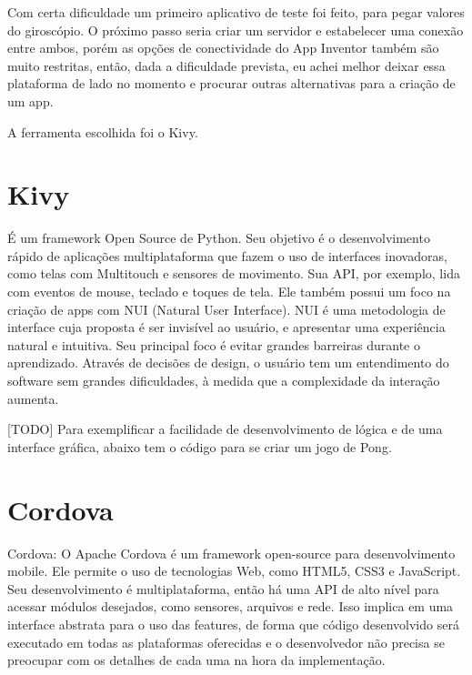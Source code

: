 \documentclass[a4paper,12pt]{article}
\begin{document}
Com certa dificuldade um primeiro aplicativo de teste foi feito, para pegar valores do giroscópio. O próximo passo seria criar um servidor e estabelecer uma conexão entre ambos, porém as opções de conectividade do App Inventor também são muito restritas, então, dada a dificuldade prevista, eu achei melhor deixar essa plataforma de lado no momento e procurar outras alternativas para a criação de um app.


A ferramenta escolhida foi o Kivy.

\section{Kivy}

É um framework Open Source de Python. Seu objetivo é o desenvolvimento rápido de aplicações multiplataforma que fazem o uso de interfaces inovadoras, como telas com Multitouch e sensores de movimento. Sua API, por exemplo, lida com eventos de mouse, teclado e toques de tela. Ele também possui um foco na criação de apps com NUI (Natural User Interface).
  NUI é uma metodologia de interface cuja proposta é ser invisível ao usuário, e apresentar uma experiência natural e intuitiva. Seu principal foco é evitar grandes barreiras durante o aprendizado. Através de decisões de design, o usuário tem um entendimento do software sem grandes dificuldades, à medida que a complexidade da interação aumenta.

[TODO] Para exemplificar a facilidade de desenvolvimento de lógica e de uma interface gráfica, abaixo tem o código para se criar um jogo de Pong.













\section{Cordova}

Cordova:
O Apache Cordova é um framework open-source para desenvolvimento mobile. Ele permite o uso de tecnologias Web, como HTML5, CSS3 e JavaScript. Seu desenvolvimento é multiplataforma, então há uma API de alto nível para acessar módulos desejados, como sensores, arquivos e rede. Isso implica em uma interface abstrata para o uso das features, de forma que código desenvolvido será executado em todas as plataformas oferecidas e o desenvolvedor não precisa se preocupar com os detalhes de cada uma na hora da implementação.
\end{document}
